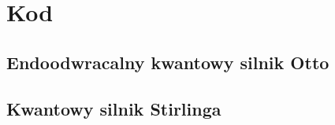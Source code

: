 
\section{Kod}
\subsection*{Endoodwracalny kwantowy silnik Otto}




\subsection*{Kwantowy silnik Stirlinga}






